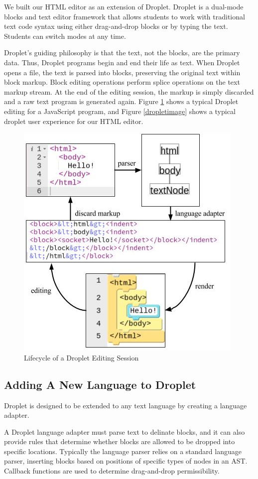 \documentclass[conference]{IEEEtran}
\begin{document}
We built our HTML editor as an extension of Droplet.  Droplet \cite{Droplet} is a dual-mode blocks and text editor framework that allows students to work with traditional text code syntax using either drag-and-drop blocks or by typing the text.  Students can switch modes at any time.

Droplet's guiding philosophy is that the text, not the blocks, are the primary data. Thus, Droplet programs begin and end their life as text. When Droplet opens a file, the text is parsed into blocks, preserving the original text within block markup. Block editing operations perform splice operations on the text markup stream. At the end of the editing session, the markup is simply discarded and a raw text program is generated again. Figure \ref{lifecycle} shows a typical Droplet editing for a JavaScript program, and Figure \ref{dropletimage} shows a typical droplet user experience for our HTML editor.

\begin{figure}
\centering
\includegraphics[width=0.5\columnwidth]{lifecycle.jpg}
\caption{Lifecycle of a Droplet Editing Session}
\label{lifecycle}
\end{figure}

\subsection{Adding A New Language to Droplet}

Droplet is designed to be extended to any text language by creating a language adapter.

A Droplet language adapter must parse text to delinate blocks, and it can also provide rules that determine whether blocks are allowed to be dropped into specific locations.  Typically the language parser relies on a standard language parser, inserting blocks based on positions of specific types of nodes in an AST.  Callback functions are used to determine drag-and-drop permissibility.
\end{document}
